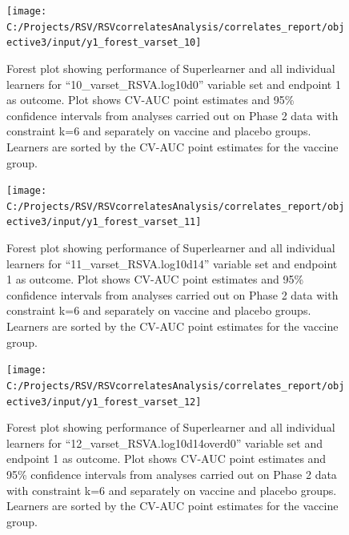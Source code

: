 \documentclass[11pt]{article}
\begin{document}
\begin{figure}[H]

{\centering \texttt{[image: C:/Projects/RSV/RSVcorrelatesAnalysis/correlates\_report/objective3/input/y1\_forest\_varset\_10]} 

}

\caption[Forest plot for ``10\_varset\_RSVA.log10d0'' variable set, endpoint 1.]{Forest plot showing performance of Superlearner and all individual learners for ``10\_varset\_RSVA.log10d0'' variable set and endpoint 1 as outcome. Plot shows CV-AUC point estimates and 95\% confidence intervals from analyses carried out on Phase 2 data with constraint k=6 and separately on vaccine and placebo groups. Learners are sorted by the CV-AUC point estimates for the vaccine group.}\label{fig:y1-forest-varset-10}
\end{figure}

\begin{figure}[H]

{\centering \texttt{[image: C:/Projects/RSV/RSVcorrelatesAnalysis/correlates\_report/objective3/input/y1\_forest\_varset\_11]} 

}

\caption[Forest plot for ``11\_varset\_RSVA.log10d14'' variable set, endpoint 1.]{Forest plot showing performance of Superlearner and all individual learners for ``11\_varset\_RSVA.log10d14'' variable set and endpoint 1 as outcome. Plot shows CV-AUC point estimates and 95\% confidence intervals from analyses carried out on Phase 2 data with constraint k=6 and separately on vaccine and placebo groups. Learners are sorted by the CV-AUC point estimates for the vaccine group.}\label{fig:y1-forest-varset-11}
\end{figure}

\begin{figure}[H]

{\centering \texttt{[image: C:/Projects/RSV/RSVcorrelatesAnalysis/correlates\_report/objective3/input/y1\_forest\_varset\_12]} 

}

\caption[Forest plot for ``12\_varset\_RSVA.log10d14overd0'' variable set, endpoint 1.]{Forest plot showing performance of Superlearner and all individual learners for ``12\_varset\_RSVA.log10d14overd0'' variable set and endpoint 1 as outcome. Plot shows CV-AUC point estimates and 95\% confidence intervals from analyses carried out on Phase 2 data with constraint k=6 and separately on vaccine and placebo groups. Learners are sorted by the CV-AUC point estimates for the vaccine group.}\label{fig:y1-forest-varset-12}
\end{figure}
\end{document}
